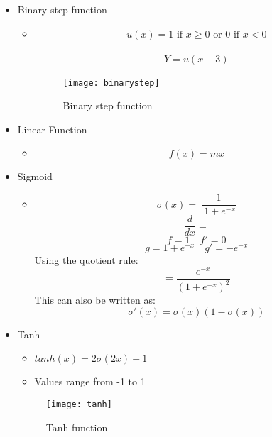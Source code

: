 \documentclass{article}
\begin{document}
\begin{itemize}
    \item Binary step function
    \begin{itemize}
        \item \begin{align*}
            u(x) = 	1 \mbox{ if }  x \geq 0 \mbox{ or } 0 \mbox{ if } x <  0
        \end{align*}


     \begin{align*}
            Y = u(x-3)
        \end{align*}
        \begin{figure}[h!]
            \centering
            \texttt{[image: binarystep]}
            \caption{Binary step function}
        \end{figure}
    \end{itemize}


    \item Linear Function
        \begin{itemize}
            \item \begin{equation*}
            f(x) = mx
        \end{equation*}
        \end{itemize}

\clearpage
    \item Sigmoid
        \begin{itemize}
            \item
            $$\sigma(x)  =\:\frac{1}{\:1+e^{-x}}$$
            $$\frac{d}{dx} =$$
            $$f  = 1 \quad f' = 0$$
            $$g  = 1 + e^{-x} \quad g' = -e^{-x}$$
            Using the quotient rule:
            $$= \frac{e^{-x}}{{(1+e^{-x})}^2}$$
            This can also be written as:
            $$\sigma'(x) = \sigma(x)(1-\sigma(x))$$

        \end{itemize}


    \item Tanh
        \begin{itemize}
        \item $tanh(x) = 2\sigma(2x)-1$
        \item Values range from -1 to 1
        \end{itemize}
        \begin{figure}[h!]
            \centering
            \texttt{[image: tanh]}
            \caption{Tanh function}
        \end{figure}



\end{itemize}
\end{document}
